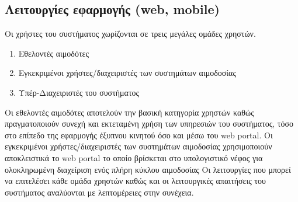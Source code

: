 	\subsection{Λειτουργίες εφαρμογής (web, mobile)}
Οι χρήστες του συστήματος χωρίζονται σε τρεις μεγάλες ομάδες χρηστών.
		\begin{enumerate}
			\item Εθελοντές αιμοδότες
			\item Εγκεκριμένοι χρήστες/διαχειριστές των συστημάτων αιμοδοσίας
			\item Υπέρ-Διαχειριστές του συστήματος
		\end{enumerate}
		
		Οι εθελοντές αιμοδότες αποτελούν την βασική κατηγορία χρηστών καθώς πραγματοποιούν συνεχή και εκτεταμένη χρήση των υπηρεσιών του συστήματος, τόσο στο επίπεδο της εφαρμογής έξυπνου κινητού όσο και μέσω του web portal. Οι εγκεκριμένοι χρήστες/διαχειριστές των συστημάτων αιμοδοσίας χρησιμοποιούν αποκλειστικά το web portal το οποίο βρίσκεται στο υπολογιστικό νέφος για ολοκληρωμένη διαχείριση ενός πλήρη κύκλου αιμοδοσίας Οι λειτουργίες που μπορεί να επιτελέσει κάθε ομάδα χρηστών καθώς και οι λειτουργικές απαιτήσεις του συστήματος αναλύονται με λεπτομέρειες στην συνέχεια.
